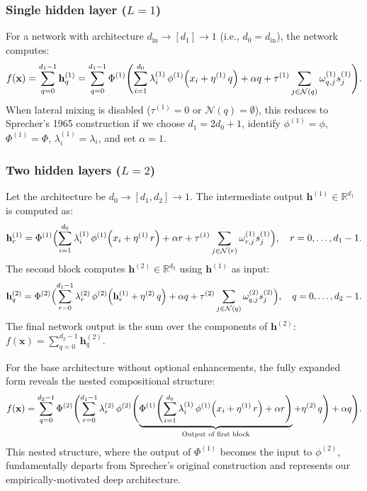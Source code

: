 \documentclass{article}
\theoremstyle{plain}
\theoremstyle{definition}
\theoremstyle{remark}
\newcommand{\mathpdf}[2]{\texorpdfstring{$#1$}{#2}}
\begin{document}
\subsubsection{Single hidden layer (\mathpdf{L=1}{L=1})}\label{sec:single_layer}
For a network with architecture $d_{\mathrm{in}}\to[d_1]\to1$ (i.e., $d_0=d_{\mathrm{in}}$), the network computes:
$$f(\mathbf{x}) = \sum_{q=0}^{d_1-1} \mathbf{h}^{(1)}_q = \sum_{q=0}^{d_1-1} \Phi^{(1)}\Biggl(\sum_{i=1}^{d_0} \lambda^{(1)}_{i}\,\phi^{(1)}\Bigl(x_i+\eta^{(1)}\,q\Bigr)+\alpha q + \tau^{(1)} \sum_{j \in \mathcal{N}(q)} \omega_{q,j}^{(1)} s_j^{(1)}\Biggr).$$
When lateral mixing is disabled ($\tau^{(1)} = 0$ or $\mathcal{N}(q) = \emptyset$), this reduces to Sprecher's 1965 construction if we choose $d_1=2d_0+1$, identify $\phi^{(1)}=\phi$, $\Phi^{(1)}=\Phi$, $\lambda^{(1)}_{i} = \lambda_i$, and set $\alpha = 1$.

\subsubsection{Two hidden layers (\mathpdf{L=2}{L=2})}
Let the architecture be $d_0\to[d_1, d_2]\to1$. The intermediate output $\mathbf{h}^{(1)} \in \mathbb{R}^{d_1}$ is computed as:
$$\mathbf{h}^{(1)}_r=\Phi^{(1)}\Bigl(\sum_{i=1}^{d_0}\lambda^{(1)}_{i}\,\phi^{(1)}\Bigl(x_i+\eta^{(1)}\,r\Bigr)+\alpha r + \tau^{(1)} \sum_{j \in \mathcal{N}(r)} \omega_{r,j}^{(1)} s_j^{(1)}\Bigr),\quad r=0,\dots,d_1-1.$$
The second block computes $\mathbf{h}^{(2)} \in \mathbb{R}^{d_2}$ using $\mathbf{h}^{(1)}$ as input:
$$\mathbf{h}^{(2)}_q=\Phi^{(2)}\Bigl(\sum_{r=0}^{d_1-1}\lambda^{(2)}_{r}\,\phi^{(2)}\Bigl(\mathbf{h}^{(1)}_r+\eta^{(2)}\,q\Bigr)+\alpha q + \tau^{(2)} \sum_{j \in \mathcal{N}(q)} \omega_{q,j}^{(2)} s_j^{(2)}\Bigr),\quad q=0,\dots,d_2-1.$$
The final network output is the sum over the components of $\mathbf{h}^{(2)}$: $f(\mathbf{x})=\sum_{q=0}^{d_2-1}\mathbf{h}^{(2)}_q$.

For the base architecture without optional enhancements, the fully expanded form reveals the nested compositional structure:
\begin{equation}\label{eq:two-layer-expanded}
f(\mathbf{x})=\sum_{q=0}^{d_2-1}\Phi^{(2)}\Biggl(\sum_{r=0}^{d_1-1}\lambda^{(2)}_{r}\,\phi^{(2)}\Biggl(\underbrace{\Phi^{(1)}\Biggl(\sum_{i=1}^{d_0}\lambda^{(1)}_{i}\,\phi^{(1)}\Bigl(x_i+\eta^{(1)}\,r\Bigr)+\alpha r\Biggr)}_{\text{Output of first block}}+\eta^{(2)}\,q\Biggr)+\alpha q\Biggr).
\end{equation}
This nested structure, where the output of $\Phi^{(1)}$ becomes the input to $\phi^{(2)}$, fundamentally departs from Sprecher's original construction and represents our empirically-motivated deep architecture.
\end{document}
